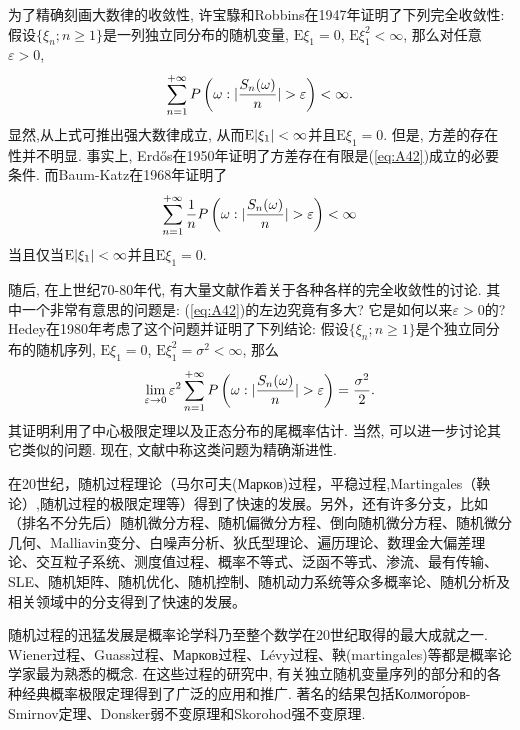 为了精确刻画大数律的收敛性, 许宝騄和Robbins在1947年证明了下列完全收敛性: 假设$\{\xi_n;n\geqslant 1\}$是一列独立同分布的随机变量, $\mathrm{E}\xi_1 = 0$, $\mathrm{E}\xi_1^2<\infty$, 那么对任意$\varepsilon>0$,\begin{equation}\label{eq:A42}
\sum_{n=1}^{+\infty}P\left( \omega:\lvert\frac{S_n(\omega)}{n}\rvert>\varepsilon \right)<\infty.
\end{equation}
显然,从上式可推出强大数律成立, 从而$\mathrm{E}\lvert\xi_1\rvert<\infty$并且$\mathrm{E}\xi_1 = 0$. 但是, 方差的存在性并不明显. 事实上, Erdős在1950年证明了方差存在有限是(\ref{eq:A42})成立的必要条件. 而Baum-Katz在1968年证明了\begin{equation}\label{eq:A43}
\sum_{n=1}^{+\infty}\frac{1}{n}P\left( \omega:\lvert\frac{S_n(\omega)}{n}\rvert>\varepsilon \right)<\infty
\end{equation}
当且仅当$\mathrm{E}\lvert\xi_1\rvert<\infty$并且$\mathrm{E}\xi_1 = 0$.

随后, 在上世纪70-80年代, 有大量文献作着关于各种各样的完全收敛性的讨论. 其中一个非常有意思的问题是: (\ref{eq:A42})的左边究竟有多大? 它是如何以来$\varepsilon>0$的? Hedey在1980年考虑了这个问题并证明了下列结论: 假设$\{\xi_n;n\geqslant 1\}$是个独立同分布的随机序列, $\mathrm{E}\xi_1=0$, $\mathrm{E}\xi_1^2 = \sigma^2<\infty$, 那么
\begin{equation}\label{eq:A44}
\lim_{\varepsilon\to 0}\varepsilon^2\sum_{n=1}^{+\infty}P\left( \omega:\lvert\frac{S_n(\omega)}{n}\rvert>\varepsilon \right) = \frac{\sigma^2}{2}.
\end{equation}
其证明利用了中心极限定理以及正态分布的尾概率估计. 当然, 可以进一步讨论其它类似的问题. 现在, 文献中称这类问题为精确渐进性.

在20世纪，随机过程理论（马尔可夫(Марков)过程，平稳过程,Martingales（鞅论）,随机过程的极限定理等）得到了快速的发展。另外，还有许多分支，比如（排名不分先后）随机微分方程、随机偏微分方程、倒向随机微分方程、随机微分几何、Malliavin变分、白噪声分析、狄氏型理论、遍历理论、数理金大偏差理论、交互粒子系统、测度值过程、概率不等式、泛函不等式、渗流、最有传输、SLE、随机矩阵、随机优化、随机控制、随机动力系统等众多概率论、随机分析及相关领域中的分支得到了快速的发展。

随机过程的迅猛发展是概率论学科乃至整个数学在20世纪取得的最大成就之一. Wiener过程、Guass过程、Марков过程、Lévy过程、鞅(martingales)等都是概率论学家最为熟悉的概念. 在这些过程的研究中, 有关独立随机变量序列的部分和的各种经典概率极限定理得到了广泛的应用和推广. 著名的结果包括Колмого́ров-Smirnov定理、Donsker弱不变原理和Skorohod强不变原理.

